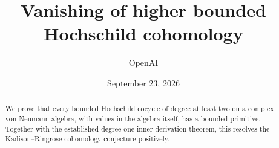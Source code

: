 \documentclass[11pt]{article}
\title{Vanishing of higher bounded Hochschild cohomology}
\author{OpenAI}
\date{September 23, 2026}
\numberwithin{equation}{section}
\theoremstyle{definition}
\theoremstyle{remark}
\begin{document}
\maketitle
\begin{abstract}
We prove that every bounded Hochschild cocycle of degree at least two
on a complex von Neumann algebra, with values in the algebra itself,
has a bounded primitive. Together with the established degree-one
inner-derivation theorem, this resolves the Kadison--Ringrose cohomology
conjecture positively.
\end{abstract}







\clearpage

\end{document}
